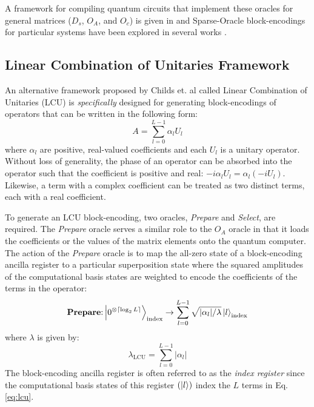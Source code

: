 A framework for compiling quantum circuits that implement these oracles for general matrices ($D_s$, $O_A$, and $O_c$) is given in \cite{camps2024explicit, camps2022fable} and Sparse-Oracle block-encodings for particular systems have been explored in several works \cite{camps2022fable, liu2024efficient, sanavio2024explicit}.

\subsection{Linear Combination of Unitaries Framework}
\label{subsec:lcu}

An alternative framework proposed by Childs et. al \cite{childs2012hamiltonian} called Linear Combination of Unitaries (LCU) is \textit{specifically} designed for generating block-encodings of operators that can be written in the following form:
\begin{equation}
    \label{eq:lcu}
    A = \sum_{l=0}^{L-1} \alpha_l U_l
\end{equation}
where $\alpha_l$ are positive, real-valued coefficients and each $U_l$ is a unitary operator.
Without loss of generality, the phase of an operator can be absorbed into the operator such that the coefficient is positive and real: $-i \alpha_l U_l = \alpha_l (-i U_l)$.
Likewise, a term with a complex coefficient can be treated as two distinct terms, each with a real coefficient.

To generate an LCU block-encoding, two oracles, \textit{Prepare} and \textit{Select}, are required. The \textit{Prepare} oracle serves a similar role to the $O_A$ oracle in that it loads the coefficients or the values of the matrix elements onto the quantum computer.
The action of the \textit{Prepare} oracle is to map the all-zero state of a block-encoding ancilla register to a particular superposition state where the squared amplitudes of the computational basis states are weighted to encode the coefficients of the terms in the operator:
\begin{equation}
    \label{eq:prep-state}
    \textbf{Prepare}\text{:} \ket{0^{\otimes \lceil \log_2 L \rceil}}_\text{index} \rightarrow \sum_{l=0}^{L-1} \sqrt{| \alpha_l | / \lambda} \ket{l}_\text{index}
\end{equation}
where $\lambda$ is given by:
\begin{equation}
    \label{eq:lambda-lcu}
    \lambda_\text{LCU} = \sum_{l=0}^{L-1} | \alpha_l |
\end{equation}
The block-encoding ancilla register is often referred to as the \textit{index register} since the computational basis states of this register $(\ket{l})$ index the $L$ terms in Eq. \ref{eq:lcu}.


